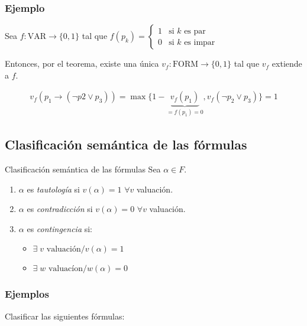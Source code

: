 \subsubsection{Ejemplo}

Sea $f: \mathrm{VAR} \to \{ 0, 1 \}$ tal que
$f(p_k) = \begin{cases}
    1 & \text{si } k \text{ es par} \\
    0 & \text{si } k \text{ es impar}
\end{cases}$

\medskip
Entonces, por el teorema, existe una única $v_f: \mathrm{FORM} \to \{ 0, 1 \}$
tal que $v_f$ extiende a $f$.

\begin{gather*}
    v_f (p_1 \to (\neg p2 \vee p_3)) =
    \max{
        \{ 1 - \underbrace{v_f (p_1)}_{= f(p_1) = 0},
        v_f (\neg p_2 \vee p_3) \}
    }
    = 1
\end{gather*}

\subsection{Clasificación semántica de las fórmulas}

\begin{definicion}{Clasificación semántica de las fórmulas}{}
    Sea $\alpha \in F.$

    \begin{enumerate}
        \item $\alpha$ es \textit{tautología} si $v(\alpha)=1$
            $\forall v$ valuación.
        \item $\alpha$ es \textit{contradicción} si $v(\alpha)=0$
            $\forall v$ valuación.
        \item $\alpha$ es \textit{contingencia} si:
            \begin{itemize}
                \item $\exists \; v \text{ valuación}/ v(\alpha) = 1$
                \item $\exists \; w \text{ valuacíon}/ w(\alpha)=0$
            \end{itemize}
    \end{enumerate}
\end{definicion}

\subsubsection{Ejemplos}

Clasificar las siguientes fórmulas:

